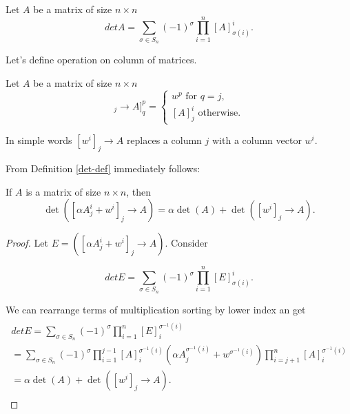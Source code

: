 \documentclass[main.tex]{subfiles}
\begin{document}
\begin{definition}
\label{det-def}
Let $A$ be a matrix of size $n \times n$
\begin{equation}
det A = \sum\limits_{\sigma\in S_n} (-1)^\sigma \prod_{i=1}^n [A]^i_{\sigma(i)}.
\end{equation}
\end{definition}

Let's define operation on column of matrices.
\begin{definition}
Let $A$ be a matrix of size $n \times n$
\begin{equation}
[[w^i]_j \to A]^p_q =
\begin{cases}
w^p \text { for } q=j,\\
[A]^i_j \text{ otherwise}.
\end{cases}
\end{equation}
\end{definition}

\noindent
In simple words $[w^i]_j \to A$ replaces a column $j$ with a column vector $w^i$.

\noindent
From Definition \ref{det-def} immediately follows:

\begin{theorem}
If $A$ is a matrix of size $n \times n$, then
\begin{equation}
\det([\alpha A^i_j + w^i]_j \to A) = \alpha \det(A) + \det([w^i]_j\to  A).
\end{equation}
\end{theorem}
\begin{proof}
Let $E = ([\alpha A^i_j + w^i]_j \to A)$. Consider


\begin{equation}
det E = \sum\limits_{\sigma\in S_n} (-1)^\sigma \prod_{i=1}^n [E]^i_{\sigma(i)}.
\end{equation}

We can rearrange terms of multiplication sorting by lower index an get
\begin{multline*}
\\
det E = \sum\limits_{\sigma\in S_n} (-1)^\sigma \prod_{i=1}^n [E]^{\sigma^{-1}(i)}_i 
\\=
\sum\limits_{\sigma\in S_n} (-1)^\sigma \prod_{i=1}^{j-1} [A]^{\sigma^{-1}(i)}_i (\alpha A^{\sigma^{-1}(i)}_j + w^{\sigma^{-1}(i)}) \prod_{i=j+1}^{n} [A]^{\sigma^{-1}(i)}_i 
\\ = \alpha \det(A) + \det([w^i]_j\to  A).
\\
\end{multline*}
\end{proof}
\end{document}
